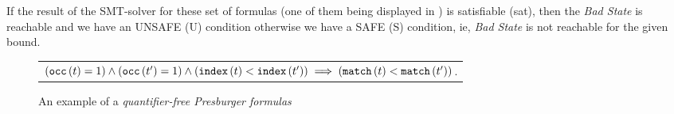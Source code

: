 If the result of the SMT-solver for these set of formulas (one of them being displayed in ) is 
satisfiable (sat), then the \emph{Bad State} is reachable and we have an UNSAFE (U) condition otherwise we have a SAFE (S) condition, ie, 
\emph{Bad State} is  not reachable for the given bound.
\begin{figure}[h]
\begin{center}
\begin{tabular}{l@{\hspace{20pt}}}
$
\left({\tt occ}\left({t}\right)=1\right)
\wedge
\left({\tt occ}\left({t'}\right)=1\right)
\wedge
\left({\tt index}\left({t}\right)<{\tt index}\left({t'}\right)\right)
\implies
\left({\tt match}\left({t}\right)<{\tt match}\left({t'}\right)\right)
$.
\end{tabular}
\end{center}
\caption{An example of a \emph{quantifier-free Presburger formulas}}\label{fig:examples}
\end{figure}